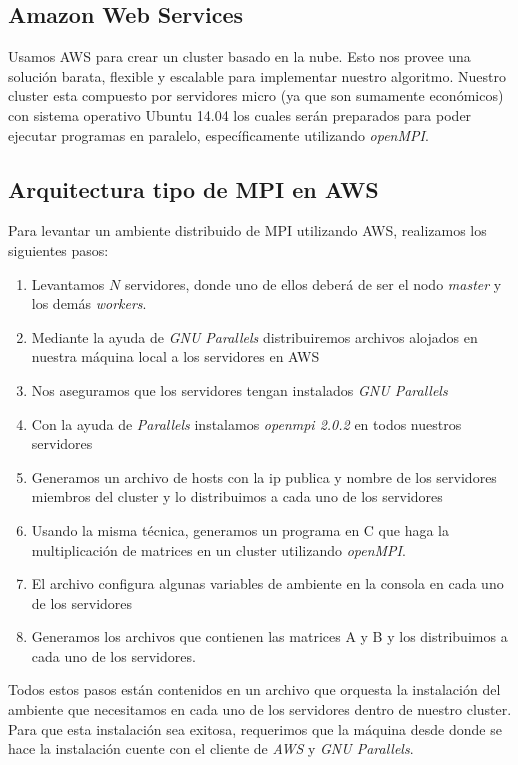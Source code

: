 \documentclass[DIV=calc, paper=letter, fontsize=11pt, twocolumn]{scrartcl}
\begin{document}
\subsection{Amazon Web Services}

Usamos AWS para crear un cluster basado en la nube. Esto nos provee una solución barata, flexible y escalable para implementar nuestro algoritmo. Nuestro cluster esta compuesto por servidores micro (ya que son sumamente económicos) con sistema operativo Ubuntu 14.04 los cuales serán preparados para poder ejecutar programas en paralelo, específicamente utilizando \textit{openMPI}.

\subsection{Arquitectura tipo de MPI en AWS}

Para levantar un ambiente distribuido de MPI utilizando AWS, realizamos los siguientes pasos:

\begin{enumerate}
    \item Levantamos $N$ servidores, donde uno de ellos deberá de ser el nodo \textit{master} y los demás \textit{workers}.
    \item Mediante la ayuda de \textit{GNU Parallels} distribuiremos archivos alojados en nuestra máquina local a los servidores en AWS
    \item Nos aseguramos que los servidores tengan instalados \textit{GNU Parallels}
    \item Con la ayuda de \textit{Parallels} instalamos \textit{openmpi 2.0.2} en todos nuestros servidores
    \item Generamos un archivo de hosts con la ip publica y nombre de los servidores miembros del cluster y lo distribuimos a cada uno de los servidores
    \item Usando la misma técnica, generamos un programa en C que haga la multiplicación de matrices en un cluster utilizando \textit{openMPI}. 
    \item El archivo  configura algunas variables de ambiente en la consola en cada uno de los servidores
    \item Generamos los archivos que contienen las matrices A y B y los distribuimos a cada uno de los servidores.
\end{enumerate}

Todos estos pasos están contenidos en un archivo que orquesta la instalación del ambiente que necesitamos en cada uno de los servidores dentro de nuestro cluster. Para que esta instalación sea exitosa, requerimos que la máquina desde donde se hace la instalación cuente con el cliente de \textit{AWS} y \textit{GNU Parallels}.
\end{document}
